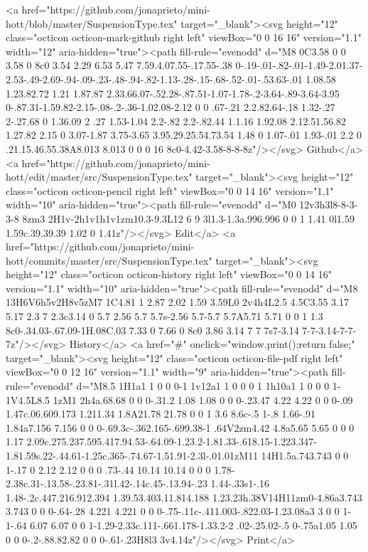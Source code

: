       <a href="https://github.com/jonaprieto/mini-hott/blob/master/SuspensionType.tex" target="_blank"><svg height="12" class="octicon octicon-mark-github right left" viewBox="0 0 16 16" version="1.1" width="12" aria-hidden="true"><path fill-rule="evenodd" d="M8 0C3.58 0 0 3.58 0 8c0 3.54 2.29 6.53 5.47 7.59.4.07.55-.17.55-.38 0-.19-.01-.82-.01-1.49-2.01.37-2.53-.49-2.69-.94-.09-.23-.48-.94-.82-1.13-.28-.15-.68-.52-.01-.53.63-.01 1.08.58 1.23.82.72 1.21 1.87.87 2.33.66.07-.52.28-.87.51-1.07-1.78-.2-3.64-.89-3.64-3.95 0-.87.31-1.59.82-2.15-.08-.2-.36-1.02.08-2.12 0 0 .67-.21 2.2.82.64-.18 1.32-.27 2-.27.68 0 1.36.09 2 .27 1.53-1.04 2.2-.82 2.2-.82.44 1.1.16 1.92.08 2.12.51.56.82 1.27.82 2.15 0 3.07-1.87 3.75-3.65 3.95.29.25.54.73.54 1.48 0 1.07-.01 1.93-.01 2.2 0 .21.15.46.55.38A8.013 8.013 0 0 0 16 8c0-4.42-3.58-8-8-8z"/></svg> Github</a>
      <a href="https://github.com/jonaprieto/mini-hott/edit/master/src/SuspensionType.tex" target="_blank"><svg height="12" class="octicon octicon-pencil right left" viewBox="0 0 14 16" version="1.1" width="10" aria-hidden="true"><path fill-rule="evenodd" d="M0 12v3h3l8-8-3-3-8 8zm3 2H1v-2h1v1h1v1zm10.3-9.3L12 6 9 3l1.3-1.3a.996.996 0 0 1 1.41 0l1.59 1.59c.39.39.39 1.02 0 1.41z"/></svg> Edit</a>
      <a href="https://github.com/jonaprieto/mini-hott/commits/master/src/SuspensionType.tex" target="_blank"><svg height="12" class="octicon octicon-history right left" viewBox="0 0 14 16" version="1.1" width="10" aria-hidden="true"><path fill-rule="evenodd" d="M8 13H6V6h5v2H8v5zM7 1C4.81 1 2.87 2.02 1.59 3.59L0 2v4h4L2.5 4.5C3.55 3.17 5.17 2.3 7 2.3c3.14 0 5.7 2.56 5.7 5.7s-2.56 5.7-5.7 5.7A5.71 5.71 0 0 1 1.3 8c0-.34.03-.67.09-1H.08C.03 7.33 0 7.66 0 8c0 3.86 3.14 7 7 7s7-3.14 7-7-3.14-7-7-7z"/></svg> History</a>
      <a  href="#" onclick="window.print();return false;" target="_blank"><svg height="12" class="octicon octicon-file-pdf right left" viewBox="0 0 12 16" version="1.1" width="9" aria-hidden="true"><path fill-rule="evenodd" d="M8.5 1H1a1 1 0 0 0-1 1v12a1 1 0 0 0 1 1h10a1 1 0 0 0 1-1V4.5L8.5 1zM1 2h4a.68.68 0 0 0-.31.2 1.08 1.08 0 0 0-.23.47 4.22 4.22 0 0 0-.09 1.47c.06.609.173 1.211.34 1.8A21.78 21.78 0 0 1 3.6 8.6c-.5 1-.8 1.66-.91 1.84a7.156 7.156 0 0 0-.69.3c-.362.165-.699.38-1 .64V2zm4.42 4.8a5.65 5.65 0 0 0 1.17 2.09c.275.237.595.417.94.53-.64.09-1.23.2-1.81.33-.618.15-1.223.347-1.81.59s.22-.44.61-1.25c.365-.74.67-1.51.91-2.3l-.01.01zM11 14H1.5a.743.743 0 0 1-.17 0 2.12 2.12 0 0 0 .73-.44 10.14 10.14 0 0 0 1.78-2.38c.31-.13.58-.23.81-.31l.42-.14c.45-.13.94-.23 1.44-.33s1-.16 1.48-.2c.447.216.912.394 1.39.53.403.11.814.188 1.23.23h.38V14H11zm0-4.86a3.743 3.743 0 0 0-.64-.28 4.221 4.221 0 0 0-.75-.11c-.411.003-.822.03-1.23.08a3 3 0 0 1-1-.64 6.07 6.07 0 0 1-1.29-2.33c.111-.661.178-1.33.2-2 .02-.25.02-.5 0-.75a1.05 1.05 0 0 0-.2-.88.82.82 0 0 0-.61-.23H8l3 3v4.14z"/></svg> Print</a>
